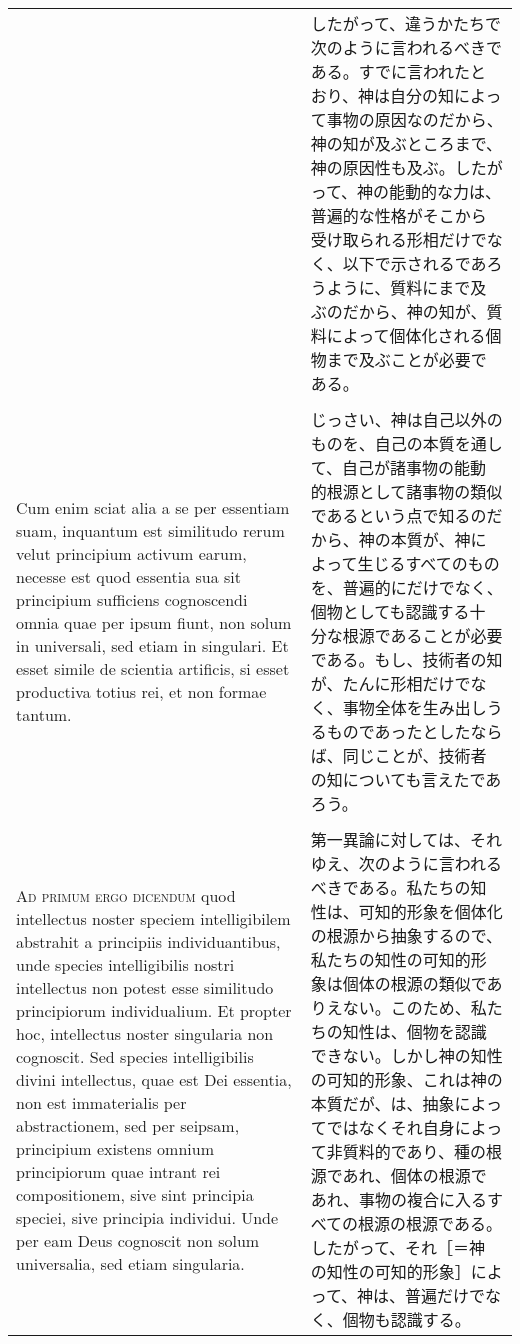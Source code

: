 \documentclass[10pt]{jsarticle} %
\begin{document}
\begin{longtable}{p{21em}p{21em}}
&

したがって、違うかたちで次のように言われるべきである。すでに言われたと
おり、神は自分の知によって事物の原因なのだから、神の知が及ぶところまで、
神の原因性も及ぶ。したがって、神の能動的な力は、普遍的な性格がそこから
受け取られる形相だけでなく、以下で示されるであろうように、質料にまで及
ぶのだから、神の知が、質料によって個体化される個物まで及ぶことが必要で
ある。

\\
\\
 
Cum enim sciat alia a se per essentiam suam, inquantum est similitudo
rerum velut principium activum earum, necesse est quod essentia sua
sit principium sufficiens cognoscendi omnia quae per ipsum fiunt, non
solum in universali, sed etiam in singulari. Et esset simile de
scientia artificis, si esset productiva totius rei, et non formae
tantum.


&

じっさい、神は自己以外のものを、自己の本質を通して、自己が諸事物の能動
的根源として諸事物の類似であるという点で知るのだから、神の本質が、神に
よって生じるすべてのものを、普遍的にだけでなく、個物としても認識する十
分な根源であることが必要である。もし、技術者の知が、たんに形相だけでな
く、事物全体を生み出しうるものであったとしたならば、同じことが、技術者
の知についても言えたであろう。


\\
\\
 

{\scshape Ad primum ergo dicendum} quod intellectus noster speciem
intelligibilem abstrahit a principiis individuantibus, unde species
intelligibilis nostri intellectus non potest esse similitudo
principiorum individualium. Et propter hoc, intellectus noster
singularia non cognoscit. Sed species intelligibilis divini
intellectus, quae est Dei essentia, non est immaterialis per
abstractionem, sed per seipsam, principium existens omnium
principiorum quae intrant rei compositionem, sive sint principia
speciei, sive principia individui. Unde per eam Deus cognoscit non
solum universalia, sed etiam singularia.


&

第一異論に対しては、それゆえ、次のように言われるべきである。私たちの知
性は、可知的形象を個体化の根源から抽象するので、私たちの知性の可知的形
象は個体の根源の類似でありえない。このため、私たちの知性は、個物を認識
できない。しかし神の知性の可知的形象、これは神の本質だが、は、抽象によっ
てではなくそれ自身によって非質料的であり、種の根源であれ、個体の根源で
あれ、事物の複合に入るすべての根源の根源である。したがって、それ［＝神
の知性の可知的形象］によって、神は、普遍だけでなく、個物も認識する。



\end{longtable}
\end{document}
